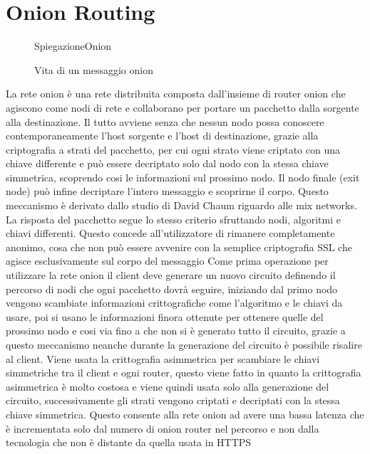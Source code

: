 \chapter{Onion Routing}
\label{chap:Capitolo1}

\begin{figure}
    \centering
    \def\svgwidth{\columnwidth}{SpiegazioneOnion}
    \caption{Vita di un messaggio onion}
    \label{fig:routing}
\end{figure}
La rete onion è una rete distribuita composta dall'insieme di router onion che agiscono come nodi di rete e collaborano per portare un pacchetto dalla sorgente alla destinazione. Il tutto avviene senza che nessun nodo possa conoscere contemporaneamente l'host sorgente e l'host di destinazione, grazie alla criptografia a strati del pacchetto, per cui ogni strato viene criptato con una chiave differente e può essere decriptato solo dal nodo con la stessa chiave simmetrica, scoprendo cosi le informazioni sul prossimo nodo. Il nodo finale (exit node) può infine decriptare l'intero messaggio e scoprirne il corpo. Questo meccanismo è derivato dallo studio di David Chaum riguardo alle mix networks. La risposta del pacchetto segue lo stesso criterio sfruttando nodi, algoritmi e chiavi differenti. Questo concede all'utilizzatore di rimanere completamente anonimo, cosa che non può essere avvenire con la semplice criptografia SSL che agisce esclusivamente sul corpo del messaggio
Come prima operazione per utilizzare la rete onion il client deve generare un nuovo circuito definendo il percorso di nodi che ogni pacchetto dovrà seguire, iniziando dal primo nodo vengono scambiate informazioni crittografiche come l'algoritmo e le chiavi da usare, poi si usano le informazioni finora ottenute per ottenere quelle del prossimo nodo e cosi via fino a che non si è generato tutto il circuito, grazie a questo meccanismo neanche durante la generazione del circuito è possibile risalire al client. Viene usata la crittografia asimmetrica per scambiare le chiavi simmetriche tra il client e ogni router, questo viene fatto in quanto la crittografia asimmetrica è molto costosa e viene quindi usata solo alla generazione del circuito, successivamente gli strati vengono criptati e decriptati con la stessa chiave simmetrica. Questo consente alla rete onion ad avere una bassa latenza che è incrementata solo dal numero di onion router nel percorso e non dalla tecnologia che non è distante da quella usata in HTTPS



